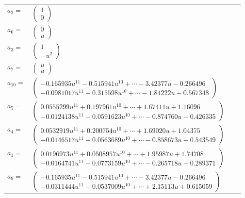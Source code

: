 \documentclass[1p]{elsarticle_modified}
\theoremstyle{definition}
\begin{document}
\begin{tabular}{m{7pt} m{180pt} m{7pt} m{180pt} }
\flushright $a_{2}=$&$\begin{pmatrix}1\\0\end{pmatrix}$ \\
\flushright $a_{6}=$&$\begin{pmatrix}0\\u\end{pmatrix}$ \\
\flushright $a_{3}=$&$\begin{pmatrix}1\\- u^2\end{pmatrix}$ \\
\flushright $a_{7}=$&$\begin{pmatrix}u\\u\end{pmatrix}$ \\
\flushright $a_{10}=$&$\begin{pmatrix}-0.165935 u^{11}-0.515941 u^{10}+\cdots-3.42377 u-0.266496\\-0.0981017 u^{11}-0.315598 u^{10}+\cdots-1.84222 u-0.567348\end{pmatrix}$ \\
\flushright $a_{5}=$&$\begin{pmatrix}0.0555299 u^{11}+0.197961 u^{10}+\cdots+1.67411 u+1.16096\\-0.0124138 u^{11}-0.0591623 u^{10}+\cdots-0.874760 u-0.426335\end{pmatrix}$ \\
\flushright $a_{4}=$&$\begin{pmatrix}0.0532919 u^{11}+0.200754 u^{10}+\cdots+1.69020 u+1.04375\\-0.0146517 u^{11}-0.0563689 u^{10}+\cdots-0.858673 u-0.543549\end{pmatrix}$ \\
\flushright $a_{1}=$&$\begin{pmatrix}0.0196973 u^{11}+0.0508957 u^{10}+\cdots+1.95987 u+1.74708\\-0.0164741 u^{11}-0.0773159 u^{10}+\cdots-0.265718 u-0.289371\end{pmatrix}$ \\
\flushright $a_{9}=$&$\begin{pmatrix}-0.165935 u^{11}-0.515941 u^{10}+\cdots-3.42377 u-0.266496\\-0.0311444 u^{11}-0.0537009 u^{10}+\cdots+2.15113 u+0.615059\end{pmatrix}$ \\

\end{tabular}
\end{document}
